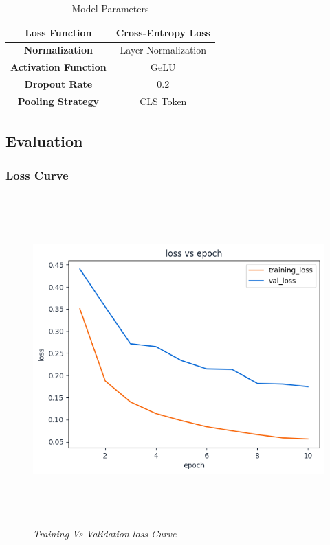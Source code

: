\begin{table}[h]
\begin{tabular}{|c|c|}
        \hline
        \textbf{Loss Function}                  & Cross-Entropy Loss  \\
        \hline
        \textbf{Normalization}                  & Layer Normalization \\
        \hline
        \textbf{Activation Function}            & GeLU                \\
        \hline
        \textbf{Dropout Rate }                  & 0.2                 \\
        \hline
        \textbf{Pooling Strategy }              & CLS Token           \\
        \hline
    \end{tabular}
    \caption{Model Parameters}
    \label{tab:model-parameters}
\end{table}
\newpage
\subsection{Evaluation}
\subsubsection{Loss Curve}
\begin{figure}[ht]
    \centering
    \includegraphics[width= 5in, height =5in ]{img/lossVsAccuracy.png}
    \caption{\textit{Training Vs Validation loss Curve}}
\end{figure}

